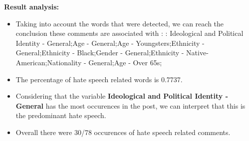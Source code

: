 \documentclass[11pt]{article}
\begin{document}
\textbf{\Large Result analysis:}

\begin{itemize}\item Taking into account the words that were detected, we can reach the conclusion these comments are associated with : :  Ideological and Political Identity - General;Age - General;Age - Youngsters;Ethnicity - General;Ethnicity - Black;Gender - General;Ethnicity - Native-American;Nationality - General;Age - Over 65s;%

\item The percentage of hate speech related words is 0.7737.

\item Considering that the variable \textbf{ Ideological and Political Identity - General} has the most occurences in the post, we can interpret that this is the predominant hate speech.

\item Overall there were 30/78 occurences of hate speech related comments.\end{itemize}
\end{document}

